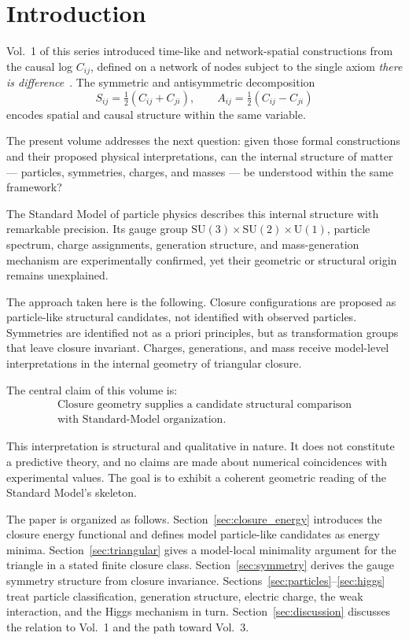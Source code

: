 \section{Introduction}

Vol.~1 of this series introduced time-like and network-spatial constructions
from the causal log $C_{ij}$, defined on a network of nodes
subject to the single axiom \emph{there is difference}~\cite{VED_vol1}.
The symmetric and antisymmetric decomposition
\begin{equation}
  S_{ij} = \tfrac{1}{2}(C_{ij}+C_{ji}), \qquad
  A_{ij} = \tfrac{1}{2}(C_{ij}-C_{ji})
\end{equation}
encodes spatial and causal structure within the same variable.

The present volume addresses the next question:
given those formal constructions and their proposed physical interpretations,
can the internal structure of matter --- particles, symmetries, charges, and masses ---
be understood within the same framework?

The Standard Model of particle physics describes this internal structure
with remarkable precision.
Its gauge group $\mathrm{SU}(3)\times\mathrm{SU}(2)\times\mathrm{U}(1)$,
particle spectrum, charge assignments, generation structure,
and mass-generation mechanism are experimentally confirmed,
yet their geometric or structural origin remains unexplained.

The approach taken here is the following.
Closure configurations are proposed as particle-like structural candidates,
not identified with observed particles.
Symmetries are identified not as a priori principles,
but as transformation groups that leave closure invariant.
Charges, generations, and mass receive model-level interpretations in the
internal geometry of triangular closure.

The central claim of this volume is:
\begin{equation}
  \boxed{\begin{gathered}
    \text{Closure geometry supplies a candidate structural comparison} \\
    \text{with Standard-Model organization.}
  \end{gathered}}
\end{equation}

This interpretation is structural and qualitative in nature.
It does not constitute a predictive theory,
and no claims are made about numerical coincidences with experimental values.
The goal is to exhibit a coherent geometric reading of the Standard Model's skeleton.

The paper is organized as follows.
Section~\ref{sec:closure_energy} introduces the closure energy functional
and defines model particle-like candidates as energy minima.
Section~\ref{sec:triangular} gives a model-local minimality argument for the
triangle in a stated finite closure class.
Section~\ref{sec:symmetry} derives the gauge symmetry structure
from closure invariance.
Sections~\ref{sec:particles}--\ref{sec:higgs} treat
particle classification, generation structure, electric charge,
the weak interaction, and the Higgs mechanism in turn.
Section~\ref{sec:discussion} discusses the relation to Vol.~1
and the path toward Vol.~3.
